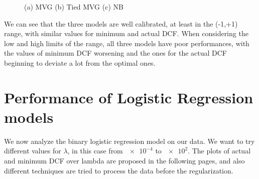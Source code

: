 \documentclass[12pt, a4paper]{article}
\begin{document}
\begin{figure}[ht]
    \centering
    \caption{(a) MVG (b) Tied MVG (c) NB}
    \label{fig:DCF_models}
\end{figure}

We can see that the three models are well calibrated, at least in the (-1,+1) range, with similar values for minimum and actual DCF. When considering the low and high limits of the range, all three models have poor performances, with the values of minimum DCF worsening and the ones for the actual DCF beginning to deviate a lot from the optimal ones.

\clearpage

\section{Performance of Logistic Regression models}
We now analyze the binary logistic regression model on our data. We want to try different values for $\lambda$, in this case from $\num{e-4}$ to $\num{e2}$. The plots of actual and minimum DCF over lambda are proposed in the following pages, and also different techniques are tried to process the data before the regularization.
\end{document}
